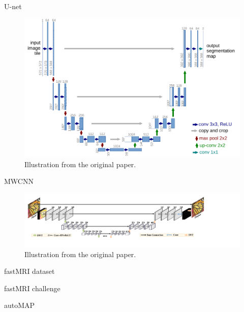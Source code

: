 \begin{frame}{U-net}
    \begin{figure}
        \centering
        \includegraphics[height=0.6\textheight]{Figures/add_slides/unet_hires.pdf}
        \caption{Illustration from the original paper.}
    \end{figure}
\end{frame}

\begin{frame}{MWCNN}
    \begin{figure}
        \centering
        \includegraphics[width=\textwidth]{Figures/add_slides/mwcnn.pdf}
        \caption{Illustration from the original paper.}
    \end{figure}
\end{frame}

\begin{frame}{fastMRI dataset}

\end{frame}

\begin{frame}{fastMRI challenge}

\end{frame}

\begin{frame}{autoMAP}

\end{frame}

